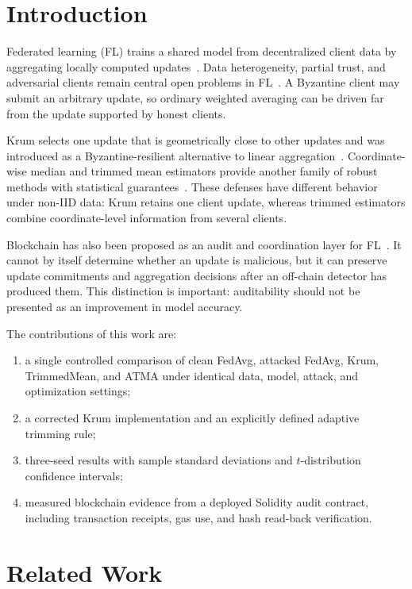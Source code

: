 \documentclass[10pt,letterpaper]{article}
\begin{document}
\section{Introduction}

Federated learning (FL) trains a shared model from decentralized client data by
aggregating locally computed updates~\cite{mcmahan2017}. Data heterogeneity,
partial trust, and adversarial clients remain central open problems in
FL~\cite{kairouz2021}. A Byzantine client may submit an arbitrary update, so
ordinary weighted averaging can be driven far from the update supported by
honest clients.

Krum selects one update that is geometrically close to other updates and was
introduced as a Byzantine-resilient alternative to linear
aggregation~\cite{blanchard2017}. Coordinate-wise median and trimmed mean
estimators provide another family of robust methods with statistical
guarantees~\cite{yin2018}. These defenses have different behavior under non-IID
data: Krum retains one client update, whereas trimmed estimators combine
coordinate-level information from several clients.

Blockchain has also been proposed as an audit and coordination layer for
FL~\cite{kim2020,lu2020}. It cannot by itself determine whether an update is
malicious, but it can preserve update commitments and aggregation decisions
after an off-chain detector has produced them. This distinction is important:
auditability should not be presented as an improvement in model accuracy.

The contributions of this work are:
\begin{enumerate}[leftmargin=*]
    \item a single controlled comparison of clean FedAvg, attacked FedAvg,
    Krum, TrimmedMean, and ATMA under identical data, model, attack, and
    optimization settings;
    \item a corrected Krum implementation and an explicitly defined adaptive
    trimming rule;
    \item three-seed results with sample standard deviations and
    $t$-distribution confidence intervals;
    \item measured blockchain evidence from a deployed Solidity audit contract,
    including transaction receipts, gas use, and hash read-back verification.
\end{enumerate}

\section{Related Work}
\end{document}
